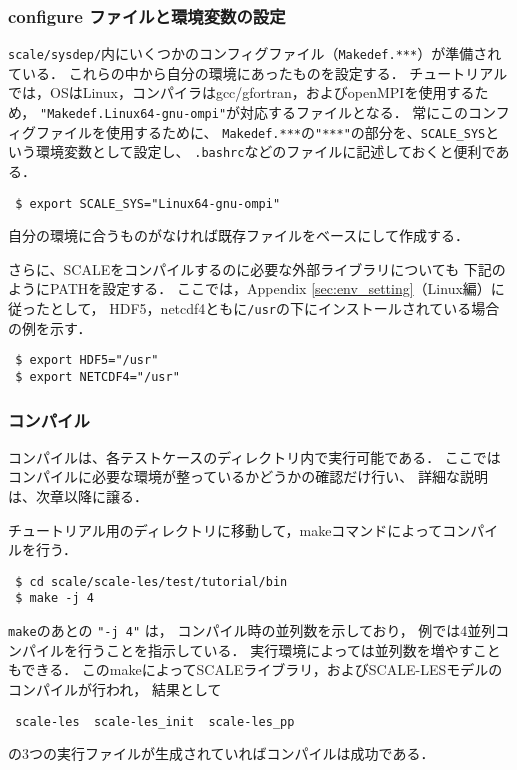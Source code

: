 \subsubsection{configure ファイルと環境変数の設定}

\verb|scale/sysdep/|内にいくつかのコンフィグファイル（\verb|Makedef.***|）が準備されている．
これらの中から自分の環境にあったものを設定する．
チュートリアルでは，OSはLinux，コンパイラはgcc/gfortran，およびopenMPIを使用するため，
\verb|"Makedef.Linux64-gnu-ompi"|が対応するファイルとなる．
常にこのコンフィグファイルを使用するために、
\verb|Makedef.***|の\verb|"***"|の部分を、\verb|SCALE_SYS|という環境変数として設定し、
\verb|.bashrc|などのファイルに記述しておくと便利である．
\begin{verbatim}
 $ export SCALE_SYS="Linux64-gnu-ompi"
\end{verbatim}
自分の環境に合うものがなければ既存ファイルをベースにして作成する．

さらに、SCALEをコンパイルするのに必要な外部ライブラリについても
下記のようにPATHを設定する．
ここでは，Appendix \ref{sec:env_setting}（Linux編）に従ったとして，
HDF5，netcdf4ともに\verb|/usr|の下にインストールされている場合の例を示す．
\begin{verbatim}
 $ export HDF5="/usr"
 $ export NETCDF4="/usr"
\end{verbatim}


\subsubsection{コンパイル}
コンパイルは、各テストケースのディレクトリ内で実行可能である．
ここではコンパイルに必要な環境が整っているかどうかの確認だけ行い、
詳細な説明は、次章以降に譲る．

チュートリアル用のディレクトリに移動して，makeコマンドによってコンパイルを行う．
\begin{verbatim}
 $ cd scale/scale-les/test/tutorial/bin
 $ make -j 4
\end{verbatim}
\verb|make|のあとの \verb|"-j 4"| は，
コンパイル時の並列数を示しており，
例では4並列コンパイルを行うことを指示している．
実行環境によっては並列数を増やすこともできる．
このmakeによってSCALEライブラリ，およびSCALE-LESモデルのコンパイルが行われ，
結果として
\begin{verbatim}
 scale-les  scale-les_init  scale-les_pp
\end{verbatim}
の3つの実行ファイルが生成されていればコンパイルは成功である．\\


